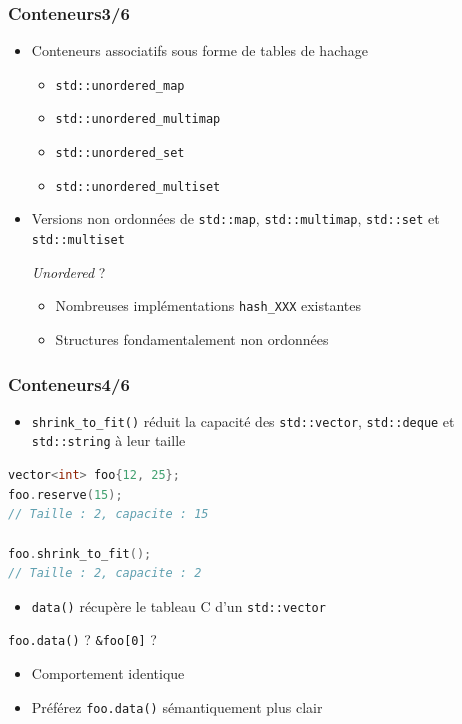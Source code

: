\documentclass[C++.tex]{subfiles}
\begin{document}
\begin{frame}[fragile]
	\frametitle{Conteneurs\titlehfill{}3/6}
	\begin{itemize}
		\item Conteneurs associatifs sous forme de tables de hachage
		\begin{itemize}
			\item \lstinline|std::unordered_map|
			\item \lstinline|std::unordered_multimap|
			\item \lstinline|std::unordered_set|
			\item \lstinline|std::unordered_multiset|
		\end{itemize}
		\item Versions non ordonnées de \lstinline|std::map|, \lstinline|std::multimap|, \lstinline|std::set| et \lstinline|std::multiset|

		\begin{block}{\textit{Unordered} ?}
			\begin{itemize}
				\item Nombreuses implémentations \lstinline|hash_XXX| existantes
				\item Structures fondamentalement non ordonnées
			\end{itemize}
		\end{block}
	\end{itemize}
\end{frame}

\begin{frame}[fragile]
	\frametitle{Conteneurs\titlehfill{}4/6}
	\begin{itemize}
		\item \lstinline|shrink_to_fit()| réduit la capacité des \lstinline|std::vector|, \lstinline|std::deque| et \lstinline|std::string| à leur taille
	\end{itemize}


	\begin{lstlisting}[language=C++]
vector<int> foo{12, 25};
foo.reserve(15);
// Taille : 2, capacite : 15

foo.shrink_to_fit();
// Taille : 2, capacite : 2\end{lstlisting}

	\begin{itemize}
		\item \lstinline|data()| récupère le \og tableau C\fg{} d'un \lstinline|std::vector|
	\end{itemize}

	\begin{block}{\lstinline|foo.data()| ? \lstinline|&foo[0]| ?}
		\begin{itemize}
			\item Comportement identique
			\item Préférez \lstinline|foo.data()| sémantiquement plus clair
		\end{itemize}
	\end{block}
\end{frame}
\end{document}
